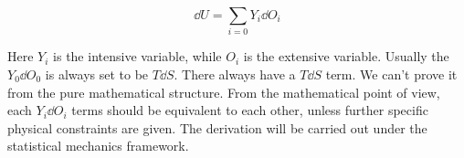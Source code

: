 \documentclass[../main.tex]{subfiles}
\begin{document}
\begin{equation}
    \dd{U} = \sum_{i=0} Y_i \dd{O_i}
\end{equation}

Here $Y_i$ is the intensive variable, while $O_i$ is the extensive variable. Usually the $Y_0 \dd{O_0}$ is always set to be $T \dd{S}$. There always have a $T\dd{S}$ term. We can't prove it from the pure mathematical structure. From the mathematical point of view, each $Y_i \dd{O_i}$ terms should be equivalent to each other, unless further specific physical constraints are given. The derivation will be carried out under the statistical mechanics framework.
\end{document}
